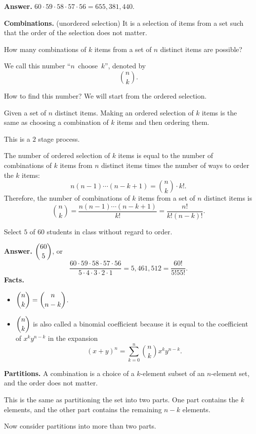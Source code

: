   \textbf{Answer.} $60\cdot 59\cdot 58\cdot 57\cdot 56 = 655,381,440$.

  \textbf{Combinations.} (unordered selection) It is a selection of items from a
  set such that the order of the selection does not matter.

  How many combinations of $k$ items from a set of $n$ distinct items are
  possible?

  We call this number ``$n$~choose~$k$'', denoted by
  \[
    \binom{n}{k}.
  \]

  How to find this number? We will start from the ordered selection.
  
  Given a set of $n$ distinct items. Making an ordered selection of $k$ items is
  the same as choosing a combination of $k$ items and then ordering them.

  This is a $2$ stage process.

  The number of ordered selection of $k$ items is equal to the number of
  combinations of $k$ items from $n$ distinct items times the number of ways to
  order the $k$ items:
  \[
    n(n-1)\cdots(n-k+1) = \binom{n}{k}\cdot k!.
  \]
  Therefore, the number of combinations of $k$ items from a set of $n$ distinct
  items is
  \[
    \binom{n}{k} = \frac{n(n-1)\cdots (n-k+1)}{k!} = \frac{n!}{k!(n-k)!}.
  \]
  
  \begin{example}
    Select $5$ of $60$ students in class without regard to order.
  \end{example}
  \textbf{Answer.} $\displaystyle\binom{60}{5}$, or
  \[
    \frac{60\cdot 59\cdot 58 \cdot 57 \cdot 56}{5\cdot 4 \cdot 3\cdot 2\cdot 1}
    = 5,461,512 = \frac{60!}{5!55!}.
  \]
  \textbf{Facts.}
  \begin{itemize}
  \item $\displaystyle\binom{n}{k} = \binom{n}{n-k}$.
  \item $\displaystyle\binom{n}{k}$ is also called a binomial coefficient because it is equal
    to the coefficient of $x^ky^{n-k}$ in the expansion
    \[
      (x+y)^n = \sum_{k=0}^n \binom{n}{k}x^k y^{n-k}.
    \]
  \end{itemize}

  \textbf{Partitions.} A combination is a choice of a $k$-element subset of an
  $n$-element set, and the order does not matter.

  This is the same as partitioning the set into two parts. One part contains the
  $k$ elements, and the other part contains the remaining $n-k$ elements.

  Now consider partitions into more than two parts.

